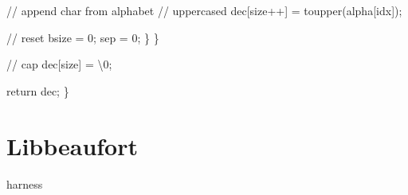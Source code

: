 \documentclass[
  a4paper,
]{scrreprt}
\newenvironment{Shaded}{\begin{snugshade}}{\end{snugshade}}
\newcommand{\CharTok}[1]{\textcolor[rgb]{0.00,0.50,0.00}{#1}}
\newcommand{\CommentTok}[1]{\textcolor[rgb]{0.41,0.41,0.41}{#1}}
\newcommand{\ControlFlowTok}[1]{\textcolor[rgb]{0.85,0.12,0.09}{#1}}
\newcommand{\DecValTok}[1]{\textcolor[rgb]{0.47,0.16,0.63}{#1}}
\newcommand{\NormalTok}[1]{\textcolor[rgb]{0.33,0.33,0.33}{#1}}
\newcommand{\OperatorTok}[1]{\textcolor[rgb]{0.00,0.46,0.62}{#1}}
\newcommand{\SpecialCharTok}[1]{\textcolor[rgb]{0.00,0.46,0.62}{#1}}
\theoremstyle{definition}
\theoremstyle{remark}
\begin{document}
\begin{Shaded}
\begin{Highlighting}[numbers=left,,]
      \CommentTok{// append char from alphabet}
      \CommentTok{// uppercased}
\NormalTok{      dec}\OperatorTok{[}\NormalTok{size}\OperatorTok{++]} \OperatorTok{=}\NormalTok{ toupper}\OperatorTok{(}\NormalTok{alpha}\OperatorTok{[}\NormalTok{idx}\OperatorTok{]);}

      \CommentTok{// reset}
\NormalTok{      bsize }\OperatorTok{=} \DecValTok{0}\OperatorTok{;}
\NormalTok{      sep }\OperatorTok{=} \DecValTok{0}\OperatorTok{;}
    \OperatorTok{\}}
  \OperatorTok{\}}

  \CommentTok{// cap}
\NormalTok{  dec}\OperatorTok{[}\NormalTok{size}\OperatorTok{]} \OperatorTok{=} \CharTok{\textquotesingle{}}\SpecialCharTok{\textbackslash{}0}\CharTok{\textquotesingle{}}\OperatorTok{;}

  \ControlFlowTok{return}\NormalTok{ dec}\OperatorTok{;}
\OperatorTok{\}}
\end{Highlighting}
\end{Shaded}

\section{Libbeaufort}\label{libbeaufort}

harness
\end{document}
